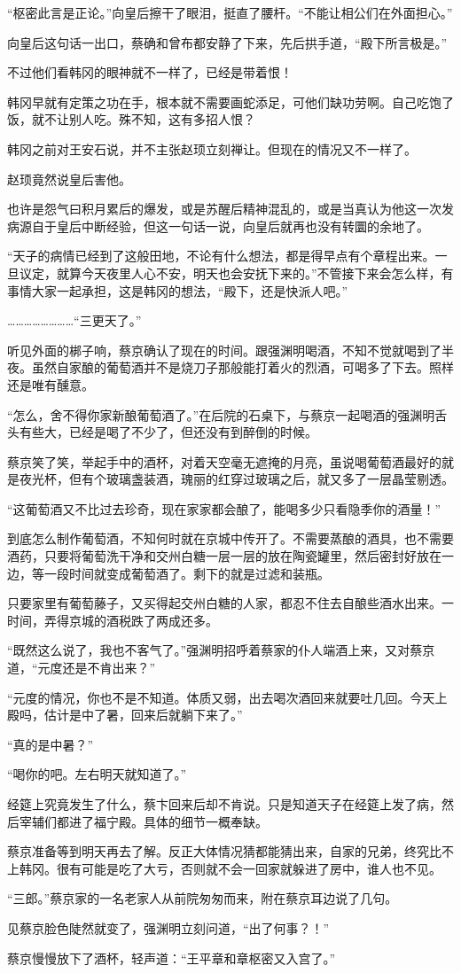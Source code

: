 “枢密此言是正论。”向皇后擦干了眼泪，挺直了腰杆。“不能让相公们在外面担心。”

向皇后这句话一出口，蔡确和曾布都安静了下来，先后拱手道，“殿下所言极是。”

不过他们看韩冈的眼神就不一样了，已经是带着恨！

韩冈早就有定策之功在手，根本就不需要画蛇添足，可他们缺功劳啊。自己吃饱了饭，就不让别人吃。殊不知，这有多招人恨？

韩冈之前对王安石说，并不主张赵顼立刻禅让。但现在的情况又不一样了。

赵顼竟然说皇后害他。

也许是怨气曰积月累后的爆发，或是苏醒后精神混乱的，或是当真认为他这一次发病源自于皇后中断经验，但这一句话一说，向皇后就再也没有转圜的余地了。

“天子的病情已经到了这般田地，不论有什么想法，都是得早点有个章程出来。一旦议定，就算今天夜里人心不安，明天也会安抚下来的。”不管接下来会怎么样，有事情大家一起承担，这是韩冈的想法，“殿下，还是快派人吧。”

……………………“三更天了。”

听见外面的梆子响，蔡京确认了现在的时间。跟强渊明喝酒，不知不觉就喝到了半夜。虽然自家酿的葡萄酒并不是烧刀子那般能打着火的烈酒，可喝多了下去。照样还是唯有醺意。

“怎么，舍不得你家新酿葡萄酒了。”在后院的石桌下，与蔡京一起喝酒的强渊明舌头有些大，已经是喝了不少了，但还没有到醉倒的时候。

蔡京笑了笑，举起手中的酒杯，对着天空毫无遮掩的月亮，虽说喝葡萄酒最好的就是夜光杯，但有个玻璃盏装酒，瑰丽的红穿过玻璃之后，就又多了一层晶莹剔透。

“这葡萄酒又不比过去珍奇，现在家家都会酿了，能喝多少只看隐季你的酒量！”

到底怎么制作葡萄酒，不知何时就在京城中传开了。不需要蒸酿的酒具，也不需要酒药，只要将葡萄洗干净和交州白糖一层一层的放在陶瓷罐里，然后密封好放在一边，等一段时间就变成葡萄酒了。剩下的就是过滤和装瓶。

只要家里有葡萄藤子，又买得起交州白糖的人家，都忍不住去自酿些酒水出来。一时间，弄得京城的酒税跌了两成还多。

“既然这么说了，我也不客气了。”强渊明招呼着蔡家的仆人端酒上来，又对蔡京道，“元度还是不肯出来？”

“元度的情况，你也不是不知道。体质又弱，出去喝次酒回来就要吐几回。今天上殿吗，估计是中了暑，回来后就躺下来了。”

“真的是中暑？”

“喝你的吧。左右明天就知道了。”

经筵上究竟发生了什么，蔡卞回来后却不肯说。只是知道天子在经筵上发了病，然后宰辅们都进了福宁殿。具体的细节一概奉缺。

蔡京准备等到明天再去了解。反正大体情况猜都能猜出来，自家的兄弟，终究比不上韩冈。很有可能是吃了大亏，否则就不会一回家就躲进了房中，谁人也不见。

“三郎。”蔡京家的一名老家人从前院匆匆而来，附在蔡京耳边说了几句。

见蔡京脸色陡然就变了，强渊明立刻问道，“出了何事？！”

蔡京慢慢放下了酒杯，轻声道：“王平章和章枢密又入宫了。”

